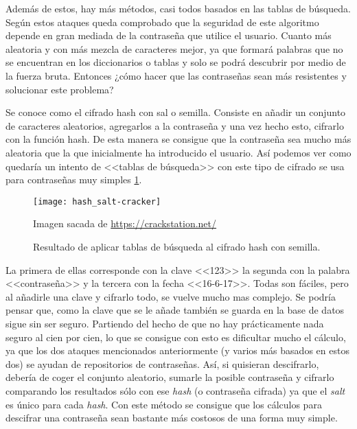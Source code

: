 Además de estos, hay más métodos, casi todos basados en las tablas de búsqueda. Según estos ataques queda comprobado que la seguridad de este algoritmo depende en gran mediada de la contraseña que utilice el usuario. Cuanto más aleatoria y con más mezcla de caracteres mejor, ya que formará palabras que no se encuentran en los diccionarios o tablas y solo se podrá descubrir por medio de la fuerza bruta. Entonces ¿cómo hacer que las contraseñas sean más resistentes y solucionar este problema?

Se conoce como el cifrado hash con sal o semilla. Consiste en añadir un conjunto de caracteres aleatorios, agregarlos a la contraseña y una vez hecho esto, cifrarlo con la función hash. De esta manera se consigue que la contraseña sea mucho más aleatoria que la que inicialmente ha introducido el usuario. Así podemos ver como quedaría un intento de <<tablas de búsqueda>> con este tipo de cifrado se usa para contraseñas muy simples \ref{fig:3.3}. 

\begin{figure}[h]
\centering
\texttt{[image: hash\_salt-cracker]}
\caption{Resultado de aplicar tablas de búsqueda al cifrado hash con semilla.} {Imagen sacada de \url{https://crackstation.net/}}
\label{fig:3.3}
\end{figure}

La primera de ellas corresponde con la clave <<123>> la segunda con la palabra <<contraseña>> y la tercera con la fecha <<16-6-17>>. Todas son fáciles, pero al añadirle una clave y cifrarlo todo, se vuelve mucho mas complejo. Se podría pensar que, como la clave que se le añade también se guarda en la base de datos sigue sin ser seguro. Partiendo del hecho de que no hay prácticamente nada seguro al cien por cien, lo que se consigue con esto es dificultar mucho el cálculo, ya que los dos ataques mencionados anteriormente (y varios más basados en estos dos) se ayudan de repositorios de contraseñas. Así, si quisieran descifrarlo, debería de coger el conjunto aleatorio, sumarle la posible contraseña y cifrarlo comparando los resultados sólo con ese \emph{hash} (o contraseña cifrada) ya que el \emph{salt} es único para cada \emph{hash}. Con este método se consigue que los cálculos para descifrar una contraseña sean bastante más costosos de una forma muy simple.
